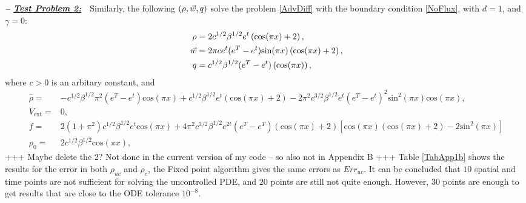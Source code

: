 \textbf{\emph{-- \underline{Test Problem 2:}}}~~Similarly, the following $(\rho,\vec{w},q)$ solve the problem \eqref{AdvDiff} with the boundary condition \eqref{NoFlux}, with $d=1$, and $\gamma = 0$:
\begin{align*}
\ \rho={}&2c^{1/2}\beta^{1/2}e^{t}\left(\text{cos}(\pi{}x)+2\right), \\
\ \vec{w}={}&2\pi{}ce^{t}(e^{T}-e^{t})\text{sin}(\pi{}x)\left(\text{cos}(\pi{}x)+2\right), \\
\ \adj={}&c^{1/2}\beta^{1/2}(e^{T}-e^{t})\left(\text{cos}(\pi{}x)\right),
\end{align*}
where $c>0$ is an arbitary constant, and
\begin{align*}
\ \widehat{\rho}={}&-c^{1/2}\beta^{1/2}\pi^2{}\left(e^{T}-e^{t}\right)\text{cos}(\pi{}x) +c^{1/2}\beta^{1/2}e^{t}\left(\text{cos}(\pi{}x) +2\right) -2\pi^{2}c^{3/2}\beta^{1/2}e^{t}(e^{T}-e^{t})^2\text{sin}^2(\pi{}x)\text{cos}(\pi{}x), \\
\ V_{\text{ext}}={}&0, \\
\ f={}&2(1+\pi^2)c^{1/2}\beta^{1/2}e^{t}\text{cos}(\pi{}x)+4\pi^2c^{3/2}\beta^{1/2}e^{2t}(e^{T}-e^{T})\left(\text{cos}(\pi{}x) +2\right)\left[\text{cos}(\pi{}x)\left(\text{cos}(\pi{}x) +2\right)-2\text{sin}^2(\pi{}x)\right] \\
\ \rho_{0}={}&2c^{1/2}\beta^{1/2}\text{cos}(\pi{}x),
\end{align*}
+++ Maybe delete the 2? Not done in the current version of my code -- so also not in Appendix B +++ 
Table \ref{TabApp1b} shows the results for the error in both $\rho_{uc}$ and $\rho_{c}$, the Fixed point algorithm gives the same errors as $Err_{uc}$. It can be concluded that $10$ spatial and time points are not sufficient for solving the uncontrolled PDE, and $20$ points are still not quite enough. However, $30$ points are enough to get results that are close to the ODE tolerance $10^{-8}$. 

